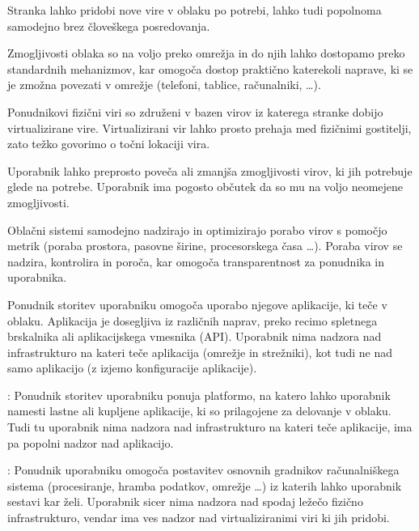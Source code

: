 \documentclass[12pt,a4paper,openany]{book}
\begin{document}
\begin{description}[style=nextline]
   \item[Storitev na zahtevo] Stranka lahko pridobi nove vire v oblaku po potrebi, lahko tudi popolnoma samodejno brez človeškega posredovanja.

   \item[Širok dostop preko omrežja] Zmogljivosti oblaka so na voljo preko omrežja in do njih lahko dostopamo preko standardnih mehanizmov, kar omogoča dostop praktično katerekoli naprave, ki se je zmožna povezati v omrežje (telefoni, tablice, računalniki, …).

   \item[Uporaba skupnih virov] Ponudnikovi fizični viri so združeni v bazen virov iz katerega stranke dobijo virtualizirane vire. Virtualizirani vir lahko prosto prehaja med fizičnimi gostitelji, zato težko govorimo o točni lokaciji vira.

   \item[Bliskovita prožnost] Uporabnik lahko preprosto poveča ali zmanjša zmogljivosti virov, ki jih potrebuje glede na potrebe. Uporabnik ima pogosto občutek da so mu na voljo neomejene zmogljivosti.

   \item[Merjenje porabe in obračun glede na porabo virov]  Oblačni sistemi samodejno nadzirajo in optimizirajo porabo virov s pomočjo metrik (poraba prostora, pasovne širine, procesorskega časa …). Poraba virov se nadzira, kontrolira in poroča, kar omogoča transparentnost za ponudnika in uporabnika.
\end{description}


\begin{description}[style=nextline]
	\item[\gls{SaaS}] Ponudnik storitev uporabniku omogoča uporabo njegove aplikacije, ki teče v oblaku. Aplikacija je dosegljiva iz različnih naprav, preko recimo spletnega brskalnika ali aplikacijskega vmesnika (\gls{API}). Uporabnik nima nadzora nad infrastrukturo na kateri teče aplikacija (omrežje in strežniki), kot tudi ne nad samo aplikacijo (z izjemo konfiguracije aplikacije).

	\item[\gls{PaaS}]: Ponudnik storitev uporabniku ponuja platformo, na katero lahko uporabnik namesti lastne ali kupljene aplikacije, ki so prilagojene za delovanje v oblaku. Tudi tu uporabnik nima nadzora nad infrastrukturo na kateri teče aplikacije, ima pa popolni nadzor nad aplikacijo.

	\item[\gls{IaaS}]: Ponudnik uporabniku omogoča postavitev osnovnih gradnikov računalniškega sistema (procesiranje, hramba podatkov, omrežje …) iz katerih lahko uporabnik sestavi kar želi. Uporabnik sicer nima nadzora nad spodaj ležečo fizično infrastrukturo, vendar ima ves nadzor nad virtualiziranimi viri ki jih pridobi.
\end{description}
\end{document}
